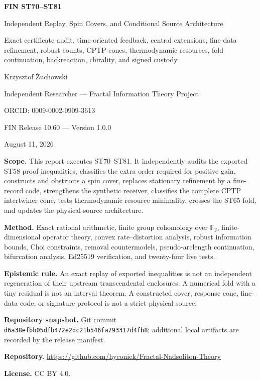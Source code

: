 \documentclass[11pt,a4paper]{article}
\begin{document}
\begin{titlepage}
\centering
\vspace*{1.15cm}
{\LARGE\bfseries FIN ST70--ST81\par}
\vspace{0.35cm}
{\Large Independent Replay, Spin Covers, and Conditional Source Architecture\par}
\vspace{0.40cm}
{\large Exact certificate audit, time-oriented feedback, central extensions, fine-data refinement, robust counts, CPTP cones, thermodynamic resources, fold continuation, backreaction, chirality, and signed custody\par}
\vspace{1.00cm}
{\Large Krzysztof Żuchowski\par}
\vspace{0.24cm}
{\large Independent Researcher --- Fractal Information Theory Project\par}
{\large ORCID: 0009-0002-0909-3613\par}
\vspace{0.80cm}
{\large FIN Release 10.60 --- Version 1.0.0\par}
{\large August 11, 2026\par}
\vfill
\begin{minipage}{0.89\textwidth}
\textbf{Scope.} This report executes ST70--ST81. It independently audits the exported ST58 proof inequalities, classifies the extra order required for positive gain, constructs and obstructs a spin cover, replaces stationary refinement by a fine-record code, strengthens the synthetic receiver, classifies the complete CPTP intertwiner cone, tests thermodynamic-resource minimality, crosses the ST65 fold, and updates the physical-source architecture.\par
\textbf{Method.} Exact rational arithmetic, finite group cohomology over $\mathbb F_2$, finite-dimensional operator theory, convex rate--distortion analysis, robust information bounds, Choi constraints, removal countermodels, pseudo-arclength continuation, bifurcation analysis, Ed25519 verification, and twenty-four live tests.\par
\textbf{Epistemic rule.} An exact replay of exported inequalities is not an independent regeneration of their upstream transcendental enclosures. A numerical fold with a tiny residual is not an interval theorem. A constructed cover, response cone, fine-data code, or signature protocol is not a strict physical source.\par
\textbf{Repository snapshot.} Git commit \texttt{d6a38efbb05dfb472e2dc21b546fa793317d4fb8}; additional local artifacts are recorded by the release manifest.\par
\textbf{Repository.} \url{https://github.com/hyconiek/Fractal-Nadsoliton-Theory}\par
\textbf{License.} CC BY 4.0.
\end{minipage}
\end{titlepage}
\end{document}
